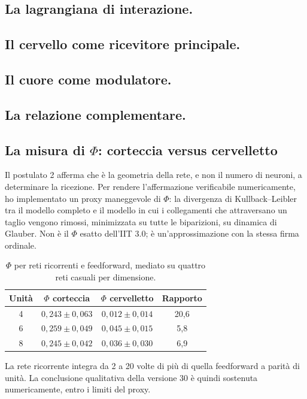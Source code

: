 \subsection{La lagrangiana di interazione.}
\subsection{Il cervello come ricevitore principale.}
\subsection{Il cuore come modulatore.}
\subsection{La relazione complementare.}

\subsection{La misura di \texorpdfstring{$\Phi$}{Phi}: corteccia versus cervelletto}
Il postulato 2 afferma che è la geometria della rete, e non il numero di neuroni, a determinare la ricezione. Per rendere l'affermazione verificabile numericamente, ho implementato un proxy maneggevole di $\Phi$: la divergenza di Kullback--Leibler tra il modello completo e il modello in cui i collegamenti che attraversano un taglio vengono rimossi, minimizzata su tutte le biparizioni, su dinamica di Glauber. Non è il $\Phi$ esatto dell'IIT 3.0; è un'approssimazione con la stessa firma ordinale.

\begin{table}[H]
\centering
\begin{tabular}{@{}cccc@{}}
\toprule
Unità & $\Phi$ corteccia & $\Phi$ cervelletto & Rapporto \\ \midrule
4 & $0,243 \pm 0,063$ & $0,012 \pm 0,014$ & 20,6 \\
6 & $0,259 \pm 0,049$ & $0,045 \pm 0,015$ & 5,8 \\
8 & $0,245 \pm 0,042$ & $0,036 \pm 0,030$ & 6,9 \\ \bottomrule
\end{tabular}
\caption{$\Phi$ per reti ricorrenti e feedforward, mediato su quattro reti casuali per dimensione.}
\label{tab:phi}
\end{table}

La rete ricorrente integra da 2 a 20 volte di più di quella feedforward a parità di unità. La conclusione qualitativa della versione 30 è quindi sostenuta numericamente, entro i limiti del proxy.

